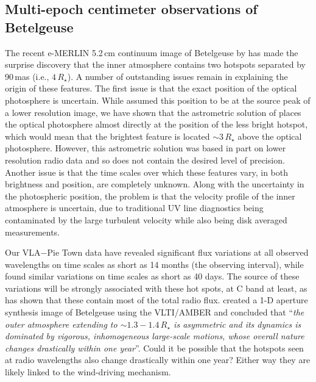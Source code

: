 \subsection{Multi-epoch centimeter observations of Betelgeuse}\label{sec:8.2.2}
The recent e-MERLIN 5.2\,cm continuum image of Betelgeuse by \cite{richards_2013} has made the surprise discovery that the inner atmosphere contains two hotspots separated by 90\,mas (i.e., $4\,R_{\star}$). A number of outstanding issues remain in explaining the origin of these features. The first issue is that the exact position of the optical photosphere is uncertain. While \cite{richards_2013} assumed this position to be at the source peak of a lower resolution image, we have shown that the astrometric solution of \cite{harper_2008} places the optical photosphere almost directly at the position of the less bright hotspot, which would mean that the brightest feature is located $\sim 3\,R_{\star}$ above the optical photosphere. However, this astrometric solution was based in part on lower resolution radio data and so does not contain the desired level of precision. Another issue is that the time scales over which these features vary, in both brightness and position, are completely unknown.  Along with the uncertainty in the photospheric position, the problem is that the velocity profile of the inner atmosphere is uncertain, due to traditional UV line diagnostics being contaminated by the large turbulent velocity while also being disk averaged measurements.

Our VLA$-$Pie Town data have revealed significant flux variations at all observed wavelengths on time scales as short as 14 months (the observing interval), while \cite{drake_1992} found similar variations on time scales as short as 40 days. The source of these variations will be strongly associated with these hot spots, at C band at least, as \cite{richards_2013} has shown that these contain most of the total radio flux. \cite{ohnaka_2011} created a 1-D aperture synthesis image of Betelgeuse using the VLTI/AMBER and concluded that  ``\textit{the outer atmosphere extending to $\mathit{\sim 1.3 - 1.4\,R_{\star}}$ is asymmetric and its dynamics is dominated by vigorous, inhomogeneous large-scale motions, whose overall nature changes drastically within one year}''. Could it be possible that the hotspots seen at radio wavelengths also  change drastically within one year? Either way they are likely linked to the wind-driving mechanism.

